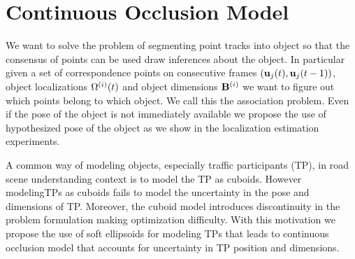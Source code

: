 \section{Continuous Occlusion Model}
\label{sec:setup}
We want to solve the problem of segmenting point tracks into object so that the
consensus of points can be used draw inferences about the object. In particular
given a set of correspondence points on consecutive frames $(\mathbf{u}_j(t),
\mathbf{u}_j(t-1))$, object localizations $\Omega^{(i)}(t)$ and object dimensions
$\mathbf{B}^{(i)}$ we want to figure out which points belong to which object. We call
this the association problem. Even if the pose of the object is not immediately
available we propose the use of hypothesized pose of the object as we show in
the localization estimation experiments. 

\def\TP{TP}
A common way of modeling objects, especially traffic participants (TP), in road
scene understanding context is to model the TP as cuboids. However modelingTPs
as cuboids fails to model the uncertainty in the pose and dimensions of TP. Moreover, the cuboid model introduces discontinuity in the problem formulation making
optimization difficulty. With this motivation we propose the use of soft
ellipsoids for modeling TPs that leads to continuous occlusion model that 
accounts for uncertainty in TP position and dimensions.
